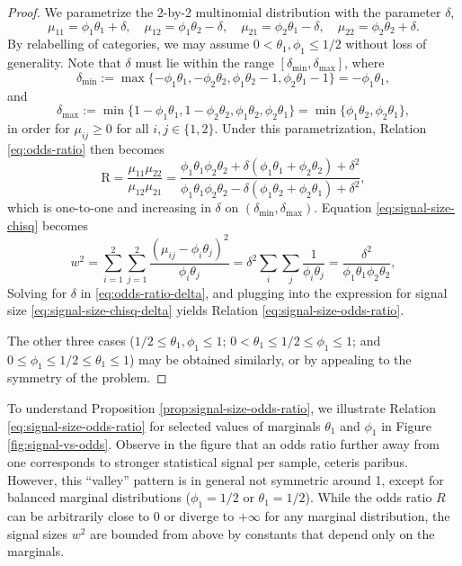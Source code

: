 \begin{proof}
	We parametrize the 2-by-2 multinomial distribution with the parameter $\delta$, 
	\begin{equation} \label{eq:reparametrize-2-by-2-table-1}
	\mu_{11} = \phi_1\theta_1+\delta,\quad 
	\mu_{12} = \phi_1\theta_2-\delta,\quad 
	\mu_{21} = \phi_2\theta_1-\delta,\quad 
	\mu_{22} = \phi_2\theta_2+\delta.
	\end{equation}
	By relabelling of categories, we may assume $0<\theta_1,\phi_1\le1/2$ without loss of generality.
	Note that $\delta$ must lie within the range $[\delta_\mathrm{min}, \delta_\mathrm{max}]$, where
	$$
	\delta_\mathrm{min} := \max\{-\phi_1\theta_1, -\phi_2\theta_2, \phi_1\theta_2-1, \phi_2\theta_1-1\} 
	= -\phi_1\theta_1,
	$$
	and
	$$
	\delta_\mathrm{max} := \min\{1-\phi_1\theta_1, 1-\phi_2\theta_2, \phi_1\theta_2, \phi_2\theta_1\}
	= \min\{\phi_1\theta_2, \phi_2\theta_1\},
	$$
	in order for $\mu_{ij}\ge0$ for all $i,j\in \{1,2\}$.
	Under this parametrization, Relation \eqref{eq:odds-ratio} then becomes
	\begin{equation} \label{eq:odds-ratio-delta}
	\text{R} = \frac{\mu_{11}\mu_{22}}{\mu_{12}\mu_{21}}
	= \frac{\phi_1\theta_1\phi_2\theta_2 + \delta(\phi_1\theta_1+\phi_2\theta_2)+\delta^2}{\phi_1\theta_1\phi_2\theta_2 - \delta(\phi_1\theta_2+\phi_2\theta_1)+\delta^2},
	\end{equation}
	which is one-to-one and increasing in $\delta$ on $(\delta_\mathrm{min}, \delta_\mathrm{max})$.
	Equation \eqref{eq:signal-size-chisq} becomes
	\begin{equation} \label{eq:signal-size-chisq-delta}
	w^2 = \sum_{i=1}^2 \sum_{j=1}^2 \frac{(\mu_{ij} - \phi_i\theta_j)^2}{\phi_i\theta_j}
	= \delta^2\sum_i\sum_j \frac{1}{\phi_i\theta_j}
	= \frac{\delta^2}{\phi_1\theta_1\phi_2\theta_2},
	\end{equation}
	Solving for $\delta$ in \eqref{eq:odds-ratio-delta}, and plugging into the expression for signal size \eqref{eq:signal-size-chisq-delta} yields Relation \eqref{eq:signal-size-odds-ratio}.
	
	The other three cases ($1/2\le\theta_1,\phi_1\le1$; $0<\theta_1\le1/2\le\phi_1\le1$; and $0\le\phi_1\le1/2\le\theta_1\le1$) may be obtained similarly, or by appealing to the symmetry of the problem.
\end{proof}

To understand Proposition \ref{prop:signal-size-odds-ratio}, we illustrate Relation \eqref{eq:signal-size-odds-ratio} for selected values of marginals $\theta_1$ and $\phi_1$ in Figure \ref{fig:signal-vs-odds}.
Observe in the figure that an odds ratio further away from one corresponds to stronger statistical signal per sample, ceteris paribus.
However, this ``valley'' pattern is in general not symmetric around 1, except for balanced marginal distributions ($\phi_1=1/2$ or $\theta_1=1/2$).
While the odds ratio $R$ can be arbitrarily close to 0 or diverge to $+\infty$ for any marginal distribution, the signal sizes $w^2$ are bounded from above by constants that depend only on the marginals.

